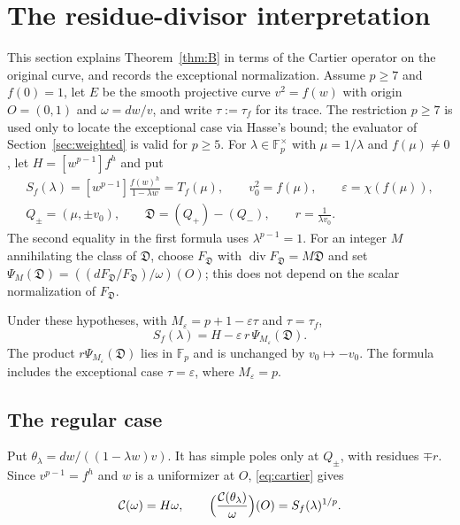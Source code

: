 \documentclass[11pt,a4paper]{article}
\numberwithin{equation}{section}
\theoremstyle{plain}
\newcommand{\letteredname}{}
\newenvironment{lettered}[2]{\renewcommand{\letteredname}{#1}\renewcommand{\theinnerlettered}{#2}\innerlettered}{\endinnerlettered}
\theoremstyle{definition}
\DeclareMathOperator{\divisor}{div}
\newcommand{\F}{\mathbb{F}}
\newcommand{\C}{\mathcal{C}}
\newcommand{\D}{\mathfrak{D}}
\newcommand{\eps}{\varepsilon}
\begin{document}
\section{The residue-divisor interpretation}\label{sec:residue}

This section explains Theorem~\ref{thm:B} in terms of the Cartier operator on the original curve, and records the exceptional normalization. Assume $p\ge7$ and $f(0)=1$, let $E$ be the smooth projective curve $v^2=f(w)$ with origin $O=(0,1)$ and $\omega=dw/v$, and write $\tau:=\tau_f$ for its trace. The restriction $p\ge7$ is used only to locate the exceptional case via Hasse's bound; the evaluator of Section~\ref{sec:weighted} is valid for $p\ge5$. For $\lambda\in\F_p^\times$ with $\mu=1/\lambda$ and $f(\mu)\neq0$, let $H=[w^{p-1}]f^h$ and put
\begin{equation}\label{eq:twopole}
\begin{gathered}
S_f(\lambda)=[w^{p-1}]\frac{f(w)^h}{1-\lambda w}=T_f(\mu),\qquad
v_0^2=f(\mu),\qquad \eps=\chi(f(\mu)),\\
Q_\pm=(\mu,\pm v_0),\qquad \D=(Q_+)-(Q_-),\qquad r=\frac1{\lambda v_0}.
\end{gathered}
\end{equation}
The second equality in the first formula uses $\lambda^{p-1}=1$. For an integer $M$ annihilating the class of $\D$, choose $F_\D$ with $\divisor F_\D=M\D$ and set $\Psi_M(\D)=((dF_\D/F_\D)/\omega)(O)$; this does not depend on the scalar normalization of $F_\D$.

\begin{lettered}{Theorem}{D}[Residue-divisor identity]\label{thm:D}
Under these hypotheses, with $M_\eps=p+1-\eps\tau$ and $\tau=\tau_f$,
\[
S_f(\lambda)=H-\eps\,r\,\Psi_{M_\eps}(\D).
\]
The product $r\Psi_{M_\eps}(\D)$ lies in $\F_p$ and is unchanged by $v_0\mapsto-v_0$. The formula includes the exceptional case $\tau=\eps$, where $M_\eps=p$.
\end{lettered}

\subsection{The regular case}
Put $\theta_\lambda=dw/((1-\lambda w)v)$. It has simple poles only at $Q_\pm$, with residues $\mp r$. Since $v^{p-1}=f^h$ and $w$ is a uniformizer at $O$, \eqref{eq:cartier} gives
\begin{equation}\label{eq:select}
\C(\omega)=H\omega,\qquad \Bigl(\frac{\C(\theta_\lambda)}{\omega}\Bigr)(O)=S_f(\lambda)^{1/p}.
\end{equation}
\end{document}
